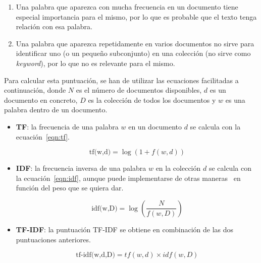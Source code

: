 \begin{enumerate}
	\item Una palabra que aparezca con mucha frecuencia en un documento tiene especial importancia para el mismo, por lo que es probable que el texto tenga relación con esa palabra.
	\item Una palabra que aparezca repetidamente en varios documentos no sirve para identificar uno (o un pequeño subconjunto) en una colección (no sirve como \textit{keyword}), por lo que no es relevante para el mismo.
\end{enumerate}

Para calcular esta puntuación, se han de utilizar las ecuaciones facilitadas a continuación, donde $N$ es el número de documentos disponibles, $d$ es un documento en concreto, $D$ es la colección de todos los documentos y $w$ es una palabra dentro de un documento.

\begin{itemize}
	\item \textbf{TF}: la frecuencia de una palabra $w$ en un documento $d$ se calcula con la ecuación~\ref{eqn:tf}.
	
	\begin{equation}\label{eqn:tf} \textrm{tf(w,d)} = \log{(1 + f(w,d))} \end{equation}
	
	\item \textbf{IDF}: la frecuencia inversa de una palabra $w$ en la colección $d$ se calcula con la ecuación~\ref{eqn:idf}, aunque puede implementarse de otras maneras~\cite{tfidfsklearn2020} en función del peso que se quiera dar.
	
	\begin{equation}\label{eqn:idf} \textrm{idf(w,D)} = \log{(\frac{N}{f(w,D)})} \end{equation}
	
	\item \textbf{TF-IDF}: la puntuación TF-IDF se obtiene en combinación de las dos puntuaciones anteriores.
	
	\begin{equation}\label{eqn:tfidf} \textrm{tf-idf(w,d,D)} = tf(w,d) \times idf(w,D) \end{equation}
	
\end{itemize}














